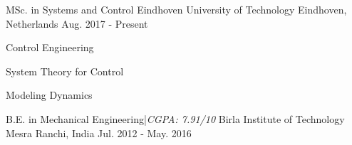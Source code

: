 \begin{cventries}
  \cventry
  	{MSc. in Systems and Control}
  	{Eindhoven University of Technology}
  	{Eindhoven, Netherlands}
  	{Aug. 2017 - Present}
  	{\begin{cvitems}
		\scriptsize	
		\item {Control Engineering}
		\item {System Theory for Control}
		\item {Modeling Dynamics}
	\end{cvitems}  	
  	}
  \cventry
    {B.E. in Mechanical Engineering\quad |\quad \textit{CGPA: 7.91/10}}
    {Birla Institute of Technology Mesra}
    {Ranchi, India}
    {Jul. 2012 - May. 2016}
    {}
\end{cventries}
\vspace{-1.5em}
     \vspace{0.75em}
\vspace{1.5em}